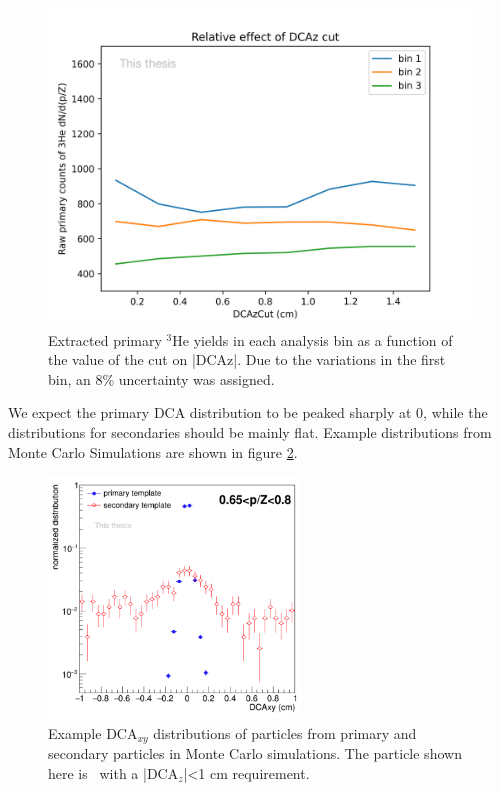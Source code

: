 \begin{figure}
    \centering
    \includegraphics[width=\textwidth]{figures/Effect_of_DCAz_cut.png}
    \caption{Extracted primary $^3\mathrm{He}$ yields in each analysis bin as a function of the value of the cut on |DCAz|. Due to the variations in the first bin, an 8\% uncertainty was assigned.}
    \label{fig:DCAzcutEffect}
\end{figure}

We expect the primary DCA distribution to be peaked sharply at 0, while the distributions for secondaries should be mainly flat. Example distributions from Monte Carlo Simulations are shown in figure \ref{fig:ExampleDCADistributions}.

\begin{figure}
    \centering
    \includegraphics[width=0.6\textwidth]{figures/Example_templates.png}
    \caption{Example DCA$_{xy}$ distributions of particles from primary and secondary particles in Monte Carlo simulations. The  particle shown here is \ahe\ with a |DCA$_z$|<1 cm requirement. }
    \label{fig:ExampleDCADistributions}
\end{figure}

